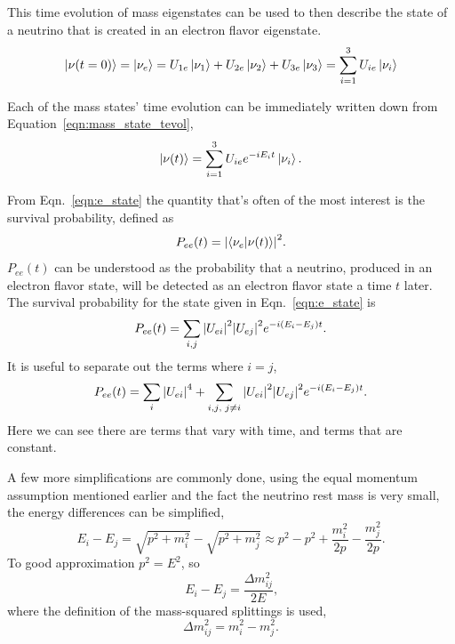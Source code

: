 This time evolution of mass eigenstates can be used to then describe the state
of a neutrino that is created in an electron flavor eigenstate.
\begin{equation}
\ket{\nu(t=0)} = \ket{\nu_{e}} = U_{1e}\ket{\nu_1} + U_{2e}\ket{\nu_{2}} + U_{3e}\ket{\nu_{3}}
    =\sum_{i=1}^{3}U_{ie}\ket{\nu_{i}}
\end{equation}

Each of the mass states' time evolution can be immediately written down from
Equation~\eqref{eqn:mass_state_tevol},
\begin{equation}
    \ket{\nu(t)} = \sum_{i=1}^{3} U_{ie}e^{-iE_{i}t}\ket{\nu_{i}}\text{.}
    \label{eqn:e_state}
\end{equation}

From Eqn.~\eqref{eqn:e_state} the quantity that's often of the most interest
is the survival probability, defined as
\begin{equation}
    P_{ee}(t) = \abs{\braket{\nu_{e}}{\nu(t)}}^{2}\text{.}
\end{equation}
$P_{ee}(t)$ can be understood as the probability that a neutrino, produced in
an electron flavor state, will be detected as an electron flavor state a time
$t$ later.
The survival probability for the state given in Eqn.~\eqref{eqn:e_state} is
\begin{equation}
    P_{ee}(t) = \sum_{i,j}\abs{U_{ei}}^2\abs{U_{ej}}^2e^{-i(E_{i} - E_{j})t}\text{.}
\end{equation}
It is useful to separate out the terms where $i=j$,
\begin{equation}
    P_{ee}(t) = \sum_{i}\abs{U_{ei}}^4 + \sum_{i,j\text{, }j \ne i}
    \abs{U_{ei}}^2\abs{U_{ej}}^2e^{-i(E_{i} - E_{j})t}\text{.}
\end{equation}
Here we can see there are terms that vary with time, and terms that are
constant.

A few more simplifications are commonly done, using the equal momentum
assumption mentioned earlier and the fact the neutrino rest mass is
very small, the energy differences can be simplified,
\begin{equation}
    E_{i} - E_{j} = \sqrt{p^{2} + m_{i}^{2}} - \sqrt{p^{2} + m_{j}^{2}} \approx
    p^{2} - p^{2} + \frac{m_{i}^2}{2p} - \frac{m_{j}^2}{2p}\text{.}
\end{equation}
To good approximation $p^2=E^2$, so
\begin{equation}
    E_{i} - E_{j} = \frac{\Delta m^{2}_{ij}}{2E}\text{,}
\end{equation}
where the definition of the mass-squared splittings is used,
\begin{equation}
    \Delta m^{2}_{ij} = m^{2}_{i} - m^{2}_{j}\text{.}
\end{equation}

